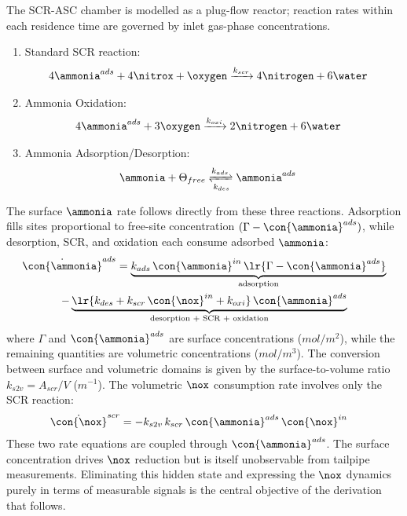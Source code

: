  The SCR-ASC chamber is modelled as a plug-flow reactor; reaction rates within each residence time are
governed by inlet gas-phase concentrations.
\begin{enumerate}
    \item Standard SCR reaction:
          \begin{align}
              4 \ammonia^{ads} + 4 \nitrox + \oxygen & \xrightarrow[]{k_{scr}} 4 \nitrogen + 6 \water \label{react::std_scr}
          \end{align}
    \item Ammonia Oxidation:
          \begin{align}
              4 \ammonia^{ads} + 3 \oxygen & \xrightarrow[]{k_{oxi}} 2 \nitrogen + 6 \water \label{react::amox}
          \end{align}
    \item Ammonia Adsorption/Desorption:
          \begin{align}
              \ammonia + \Theta_{free} & \xrightleftharpoons[k_{des}]{k_{ads}} \ammonia^{ads}
              \label{react::ads}
          \end{align}
\end{enumerate}
The surface $\ammonia$ rate follows directly from these three reactions. Adsorption fills sites proportional to
free-site concentration $(\Gamma - \con{\ammonia}^{ads})$, while desorption, SCR, and oxidation each consume adsorbed
$\ammonia$:
\begin{multline}
    \dot{\con{\ammonia}}^{ads} = \underbrace{k_{ads}\,\con{\ammonia}^{in}\,\lr{\Gamma - \con{\ammonia}^{ads}}}_{\text{adsorption}} \\
    - \underbrace{\lr{k_{des} + k_{scr}\,\con{\nox}^{in} + k_{oxi}}\,\con{\ammonia}^{ads}}_{\text{desorption + SCR + oxidation}}
    \label{eqn::nh3_ads_rate}
\end{multline}
where $\Gamma$ and $\con{\ammonia}^{ads}$ are surface concentrations ($mol/m^2$), while the remaining quantities are
volumetric concentrations ($mol/m^3$). The conversion between surface and volumetric domains is given by the
surface-to-volume ratio $k_{s2v} = A_{scr}/V$ ($m^{-1}$). The volumetric $\nox$ consumption rate involves only the SCR
reaction:
\begin{align}
    \dot{\con{\nox}}^{scr} &= -k_{s2v}\,k_{scr}\,\con{\ammonia}^{ads}\,\con{\nox}^{in}
    \label{eqn::nox_rate}
\end{align}
These two rate equations are coupled through $\con{\ammonia}^{ads}$. The surface concentration drives $\nox$
reduction but is itself unobservable from tailpipe measurements. Eliminating this hidden state and expressing the $\nox$
dynamics purely in terms of measurable signals is the central objective of the derivation that follows.
